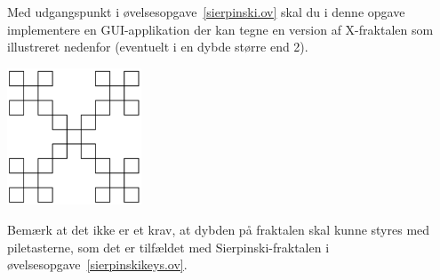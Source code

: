 Med udgangspunkt i øvelsesopgave~\ref{sierpinski.ov} skal du i denne opgave implementere en GUI-applikation der kan tegne en version af X-fraktalen som illustreret nedenfor (eventuelt i en dybde større end 2).
\begin{center}
  \includegraphics[width=0.3\textwidth]{xfractal.png}
\end{center}
Bemærk at det ikke er et krav, at dybden på fraktalen skal kunne styres med piletasterne, som det er tilfældet med Sierpinski-fraktalen i øvelsesopgave~\ref{sierpinskikeys.ov}.

